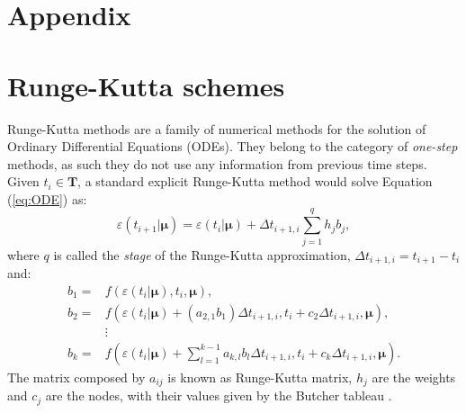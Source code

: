 \section*{Appendix}
\section{Runge-Kutta schemes}
\label{sec:RK}
Runge-Kutta methods \cite{Ascher1998ComputerMF} are a family of numerical methods for the solution of Ordinary Differential Equations (ODEs). They belong to the category of \textit{one-step} methods, as such they do not use any information from previous time steps. Given $t_i\in\mathbf{T}$, a standard explicit Runge-Kutta method would solve Equation (\ref{eq:ODE}) as:
\begin{equation}
\label{eq:rungekutta_reduced}
    \varepsilon(t_{i+1}|\pmb{\mu}) = \varepsilon(t_{i}|\pmb{\mu}) + \Delta t_{i+1,i}\sum_{j=1}^q h_j b_j,
\end{equation}
where $q$ is called the \textit{stage} of the Runge-Kutta approximation, $\Delta t_{i+1,i} = t_{i+1}-t_i$ and:
\begin{align*}
     b_1 = &f(\varepsilon(t_{i}|\pmb{\mu}),t_{i},\pmb{\mu}),\\
     b_2 = &f(\varepsilon(t_{i}|\pmb{\mu})+(a_{2,1}b_1)\Delta t_{i+1,i},t_i+c_2\Delta t_{i+1,i},\pmb{\mu}),\\
    & \vdots \\
    b_k = & f(\varepsilon(t_{i}|\pmb{\mu})+\sum_{l=1}^{k-1}a_{k,l}b_l\Delta t_{i+1,i}, t_i+c_k\Delta t_{i+1,i},\pmb{\mu}).
\end{align*}
The matrix composed by $a_{ij}$ is known as Runge-Kutta matrix, $h_j$ are the weights and $c_j$ are the nodes, with their values given by the Butcher tableau \cite{butcher_1963}.

